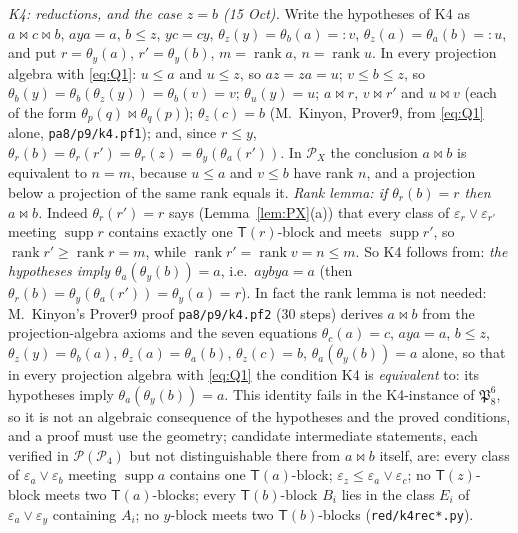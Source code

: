 \documentclass[11pt]{amsart}
\theoremstyle{definition}
\renewcommand{\P}{\mathcal{P}}
\newcommand{\supp}{\operatorname{supp}}
\newcommand{\T}{\mathsf{T}}
\newcommand{\rk}{\operatorname{rank}}
\newcommand{\mt}{\bowtie}   %
\begin{document}
\emph{K4: reductions, and the case $z=b$ (15 Oct).} Write the hypotheses of K4 as $a\mt c\mt b$, $aya=a$, $b\le z$, $yc=cy$, $\theta_z(y)=\theta_b(a)=:v$, $\theta_z(a)=\theta_a(b)=:u$, and put $r=\theta_y(a)$, $r'=\theta_y(b)$, $m=\rk a$, $n=\rk u$. In every projection algebra with \eqref{eq:Q1}: $u\le a$ and $u\le z$, so $az=za=u$; $v\le b\le z$, so $\theta_b(y)=\theta_b(\theta_z(y))=\theta_b(v)=v$; $\theta_u(y)=u$; $a\mt r$, $v\mt r'$ and $u\mt v$ (each of the form $\theta_p(q)\mt\theta_q(p)$); $\theta_z(c)=b$ (M.~Kinyon, Prover9, from \eqref{eq:Q1} alone, \texttt{pa8/p9/k4.pf1}); and, since $r\le y$, $\theta_r(b)=\theta_r(r')=\theta_r(z)=\theta_y(\theta_a(r'))$. In $\P_X$ the conclusion $a\mt b$ is equivalent to $n=m$, because $u\le a$ and $v\le b$ have rank $n$, and a projection below a projection of the same rank equals it. \emph{Rank lemma: if $\theta_r(b)=r$ then $a\mt b$.} Indeed $\theta_r(r')=r$ says (Lemma~\ref{lem:PX}(a)) that every class of $\varepsilon_r\vee\varepsilon_{r'}$ meeting $\supp r$ contains exactly one $\T(r)$-block and meets $\supp r'$, so $\rk r'\ge\rk r=m$, while $\rk r'=\rk v=n\le m$. So K4 follows from: \emph{the hypotheses imply $\theta_a(\theta_y(b))=a$}, i.e.\ $aybya=a$ (then $\theta_r(b)=\theta_y(\theta_a(r'))=\theta_y(a)=r$). In fact the rank lemma is not needed: M.~Kinyon's Prover9 proof \texttt{pa8/p9/k4.pf2} ($30$ steps) derives $a\mt b$ from the projection-algebra axioms and the seven equations $\theta_c(a)=c$, $aya=a$, $b\le z$, $\theta_z(y)=\theta_b(a)$, $\theta_z(a)=\theta_a(b)$, $\theta_z(c)=b$, $\theta_a(\theta_y(b))=a$ alone, so that in every projection algebra with \eqref{eq:Q1} the condition K4 is \emph{equivalent} to: its hypotheses imply $\theta_a(\theta_y(b))=a$. This identity fails in the K4-instance of $\mathfrak P_8^6$, so it is not an algebraic consequence of the hypotheses and the proved conditions, and a proof must use the geometry; candidate intermediate statements, each verified in $\P(\P_4)$ but not distinguishable there from $a\mt b$ itself, are: every class of $\varepsilon_a\vee\varepsilon_b$ meeting $\supp a$ contains one $\T(a)$-block; $\varepsilon_z\le\varepsilon_a\vee\varepsilon_c$; no $\T(z)$-block meets two $\T(a)$-blocks; every $\T(b)$-block $B_i$ lies in the class $E_i$ of $\varepsilon_a\vee\varepsilon_y$ containing $A_i$; no $y$-block meets two $\T(b)$-blocks (\texttt{red/k4rec*.py}).
\end{document}
